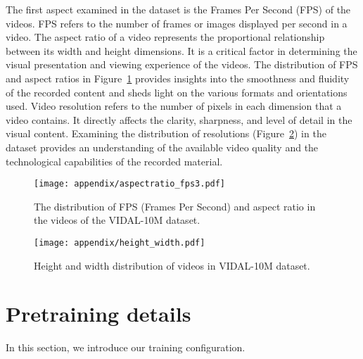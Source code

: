 \documentclass{article} \usepackage{iclr2024_conference,times}
\begin{document}
The first aspect examined in the dataset is the Frames Per Second (FPS) of the videos. FPS refers to the number of frames or images displayed per second in a video. The aspect ratio of a video represents the proportional relationship between its width and height dimensions. It is a critical factor in determining the visual presentation and viewing experience of the videos. The distribution of FPS and aspect ratios in Figure~\ref{fig:aspectratio_fps} provides insights into the smoothness and fluidity of the recorded content and sheds light on the various formats and orientations used. Video resolution refers to the number of pixels in each dimension that a video contains. It directly affects the clarity, sharpness, and level of detail in the visual content. Examining the distribution of resolutions (Figure~\ref{fig:height_width}) in the dataset provides an understanding of the available video quality and the technological capabilities of the recorded material.
\begin{figure}[htpb]
\centerline{\texttt{[image: appendix/aspectratio\_fps3.pdf]}}
  \caption{The distribution of FPS (Frames Per Second) and aspect ratio in the videos of the VIDAL-10M dataset.}  
  \label{fig:aspectratio_fps}
\vspace{-0cm} 
\end{figure}

\begin{figure}[htpb]
\centerline{\texttt{[image: appendix/height\_width.pdf]}}
  \caption{Height and width distribution of videos in VIDAL-10M dataset.}  
  \label{fig:height_width}
\vspace{-0cm} 
\end{figure}


\section{Pretraining details}
\label{appendix:pretraining_details}
In this section, we introduce our training configuration. 
\end{document}
